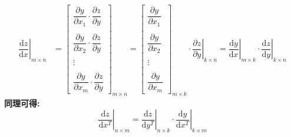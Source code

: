 \documentclass[withoutpreface,bwprint]{cumcmthesis} %
\begin{document}
	\begin{align*}
		\left.\dfrac{\mathrm{d} z}{\mathrm{d} x}\right|_{m{\times}n}&=
				\left[
		\begin{array}{c}
			\dfrac{\partial y}{\partial x_1}\cdot \dfrac{\partial z}{\partial y}\\\\
			\dfrac{\partial y}{\partial x_2}\cdot \dfrac{\partial z}{\partial y}\\\\
			\vdots\\\\
			\dfrac{\partial y}{\partial x_m}\cdot \dfrac{\partial z}{\partial y}
		\end{array}
		\right]_{m{\times}n}
		=\left[
		\begin{array}{c}
			\dfrac{\partial y}{\partial x_1}\\\\
			\dfrac{\partial y}{\partial x_2}\\\\
			\vdots\\\\
			\dfrac{\partial y}{\partial x_m}
		\end{array}
		\right]_{m{\times}k} \cdot \left. \dfrac{\partial z}{\partial y}\right|_{k{\times}n}=\left.\dfrac{\mathrm{d} y}{\mathrm{d} x}\right|_{m{\times}k}\cdot  \left.\dfrac{\mathrm{d} z}{\mathrm{d} y}\right|_{k{\times}n}
	\end{align*}
	\textbf{同理可得:}
	\begin{equation}
		\left.\dfrac{\mathrm{d} z}{\mathrm{d} x^T}\right|_{n{\times}m}=
		\left.\dfrac{\mathrm{d} z}{\mathrm{d} y^T}\right|_{n{\times}k}
		\cdot
		\left.\dfrac{\mathrm{d} y}{\mathrm{d} x^T}\right|_{k{\times}m}
		\label{con:inventoryflow3}
	\end{equation}
\end{document}
